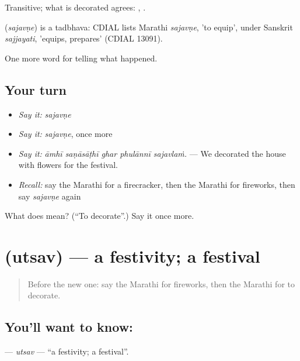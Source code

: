 Transitive; what is decorated agrees:  ,  .

\begin{cousinweb}
\textbf{} (\emph{sajavṇe}) is a tadbhava: CDIAL lists Marathi \emph{sajavṇe}, 'to equip', under Sanskrit \emph{sajjayati}, 'equips, prepares' (CDIAL 13091).
\end{cousinweb}

\begin{grammarlens}[title={What you've built}]
One more word for telling what happened.
\end{grammarlens}

\subsection*{Your turn}
\begin{itemize}
\raggedright
  \item \emph{Say it:} \emph{sajavṇe}
  \item \emph{Say it:} \emph{sajavṇe}, once more
  \item \emph{Say it:} \emph{āmhī saṇāsāṭhī ghar phulānnī sajavlaṁ.} — We decorated the house with flowers for the festival.
  \item \emph{Recall:} say the Marathi for a firecracker, then the Marathi for fireworks, then say \emph{sajavṇe} again
\end{itemize}

\begin{tcolorbox}[breakable,colback=teal!4,colframe=teal!35!black,title={Before you move on}]
What does  mean? (\textquotedblleft{}To decorate\textquotedblright{}.) Say it once more.
\end{tcolorbox}
\section[\texorpdfstring{\mr{उत्सव} (utsav)}{उत्सव (utsav)}]{ (utsav) — a festivity; a festival}

\label{lesson:MR-C320-utsav}



\begin{quote}
Before the new one: say the Marathi for fireworks, then the Marathi for to decorate.
\end{quote}

\subsection*{You'll want to know: }
\textbf{} — \emph{utsav} — \textquotedblleft{}a festivity; a festival\textquotedblright{}.

